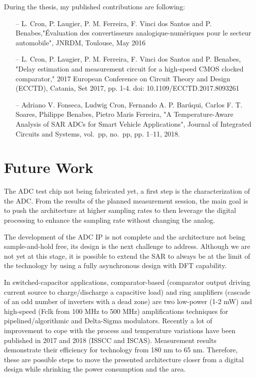 During the thesis, my published contributions are following:
\begin{itemize}
	\item[--] L. Cron, P. Laugier, P. M. Ferreira, F. Vinci dos Santos and P. Benabes,"Évaluation des convertisseurs analogique-numériques pour le secteur automobile", JNRDM, Toulouse, May 2016
	\item[--] L. Cron, P. Laugier, P. M. Ferreira, F. Vinci dos Santos and P. Benabes, "Delay estimation and measurement circuit for a high-speed CMOS clocked comparator," 2017 European Conference on Circuit Theory and Design (ECCTD), Catania, Set 2017, pp. 1-4. doi: 10.1109/ECCTD.2017.8093261
	\item[--] Adriano V. Fonseca, Ludwig Cron, Fernando A. P. Barúqui, Carlos F. T. Soares, Philippe Benabes, Pietro Maris Ferreira, "A Temperature-Aware Analysis of SAR ADCs for Smart Vehicle Applications", Journal of Integrated Circuits and Systems, vol.~pp, no.~pp, pp. 1--11, 2018.
\end{itemize}

\clearpage
\section{Future Work}          %
The ADC test chip not being fabricated yet, a first step is the characterization of the ADC\@. From the results of the planned measurement session, the main goal is to push the architecture at higher sampling rates to then leverage the digital processing to enhance the sampling rate without changing the analog.

The development of the ADC IP is not complete and the architecture not being sample-and-hold free, its design is the next challenge to address. Although we are not yet at this stage, it is possible to extend the SAR to always be at the limit of the technology by using a fully asynchronous design with DFT capability.

In switched-capacitor applications, comparator-based (comparator output driving current source to charge/discharge a capacitive load) and ring amplifiers (cascade of an odd number of inverters with a dead zone) are two low-power (1-2 mW) and high-speed (Fclk from 100 MHz to 500 MHz) amplifications techniques for pipelined/algorithmic and Delta-Sigma modulators. Recently a lot of improvement to cope with the process and temperature variations have been published in 2017 and 2018 (ISSCC and ISCAS). Measurement results demonstrate their efficiency for technology from 180 nm to 65 nm. Therefore, these are possible steps to move the presented architecture closer from a digital design while shrinking the power consumption and the area.

